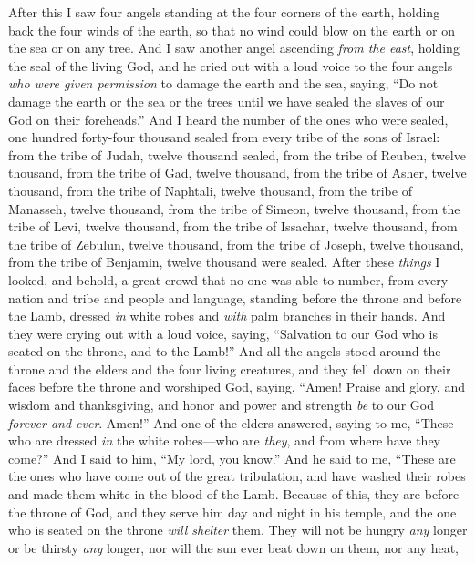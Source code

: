 \begin{biblechapter} %
 After this I saw four angels standing at the four corners of the earth, holding back the four winds of the earth, so that no wind could blow on the earth or on the sea or on any tree.
\verse And I saw another angel ascending \textit{from the east}, holding the seal of the living God, and he cried out with a loud voice to the four angels \textit{who were given permission} to damage the earth and the sea,
\verse saying, “Do not damage the earth or the sea or the trees until we have sealed the slaves of our God on their foreheads.”
\verse And I heard the number of the ones who were sealed, one hundred forty-four thousand sealed from every tribe of the sons of Israel:
\verse from the tribe of Judah, twelve thousand sealed, from the tribe of Reuben, twelve thousand, from the tribe of Gad, twelve thousand,
\verse from the tribe of Asher, twelve thousand, from the tribe of Naphtali, twelve thousand, from the tribe of Manasseh, twelve thousand,
\verse from the tribe of Simeon, twelve thousand, from the tribe of Levi, twelve thousand, from the tribe of Issachar, twelve thousand,
\verse from the tribe of Zebulun, twelve thousand, from the tribe of Joseph, twelve thousand, from the tribe of Benjamin, twelve thousand were sealed.
 After these \textit{things} I looked, and behold, a great crowd that no one was able to number, from every nation and tribe and people and language, standing before the throne and before the Lamb, dressed \textit{in} white robes and \textit{with} palm branches in their hands.
\verse And they were crying out with a loud voice, saying, “Salvation to our God 
who is seated on the throne, 
and to the Lamb!”
\verse And all the angels stood around the throne and the elders and the four living creatures, and they fell down on their faces before the throne and worshiped God,
\verse saying, “Amen! Praise and glory, 
and wisdom and thanksgiving, 
and honor and power and strength 
\textit{be} to our God \textit{forever and ever}. Amen!”
\verse And one of the elders answered, saying to me, “These who are dressed \textit{in} the white robes—who are \textit{they}, and from where have they come?”
\verse And I said to him, “My lord, you know.” And he said to me,
\verse “These are the ones who have come out of the great tribulation, 
and have washed their robes 
and made them white in the blood of the Lamb.
\verse Because of this, they are before the throne of God, 
and they serve him day and night in his temple, 
and the one who is seated on the throne \textit{will shelter} them.
\verse They will not be hungry \textit{any} longer or be thirsty \textit{any} longer, 
nor will the sun ever beat down on them, nor any heat,
\end{biblechapter}

